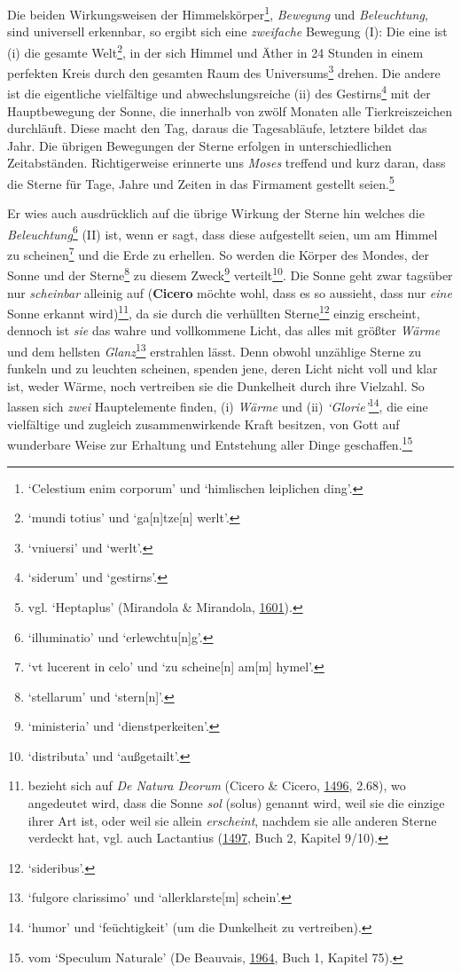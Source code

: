 \documentclass[
]{article}
\begin{document}
Die beiden Wirkungsweisen der Himmelskörper\footnote{`Celestium enim
  corporum' und `himlischen leiplichen ding'.}, \emph{Bewegung} und
\emph{Beleuchtung}, sind universell erkennbar, so ergibt sich eine
\emph{zweifache} Bewegung (I): Die eine ist (i) die gesamte
Welt\footnote{`mundi totius' und `ga{[}n{]}tze{[}n{]} werlt'.}, in der
sich Himmel und Äther in 24 Stunden in einem perfekten Kreis durch den
gesamten Raum des Universums\footnote{`vniuersi' und `werlt'.} drehen.
Die andere ist die eigentliche vielfältige und abwechslungsreiche (ii)
des Gestirns\footnote{`siderum' und `gestirns'.} mit der Hauptbewegung
der Sonne, die innerhalb von zwölf Monaten alle Tierkreiszeichen
durchläuft. Diese macht den Tag, daraus die Tagesabläufe, letztere
bildet das Jahr. Die übrigen Bewegungen der Sterne erfolgen in
unterschiedlichen Zeitabständen. Richtigerweise erinnerte uns
\emph{Moses} treffend und kurz daran, dass die Sterne für Tage, Jahre
und Zeiten in das Firmament gestellt seien.\footnote{vgl. `Heptaplus'
  (Mirandola \& Mirandola,
  \href{https://doi.org/10.3931/e-rara-61217}{1601}).}

Er wies auch ausdrücklich auf die übrige Wirkung der Sterne hin welches
die \emph{Beleuchtung}\footnote{`illuminatio' und `erlewchtu{[}n{]}g'.}
(II) ist, wenn er sagt, dass diese aufgestellt seien, um am Himmel zu
scheinen\footnote{`vt lucerent in celo' und `zu scheine{[}n{]} am{[}m{]}
  hymel'.} und die Erde zu erhellen. So werden die Körper des Mondes,
der Sonne und der Sterne\footnote{`stellarum' und `stern{[}n{]}'.} zu
diesem Zweck\footnote{`ministeria' und `dienstperkeiten'.}
verteilt\footnote{`distributa' und `außgetailt'.}. Die Sonne geht zwar
tagsüber nur \emph{scheinbar} alleinig auf (\textbf{Cicero} möchte wohl,
dass es so aussieht, dass nur \emph{eine} Sonne erkannt
wird)\footnote{bezieht sich auf \emph{De Natura Deorum} (Cicero \&
  Cicero, \href{https://doi.org/10.3931/e-rara-89116}{1496}, 2.68), wo
  angedeutet wird, dass die Sonne \emph{sol} (solus) genannt wird, weil
  sie die einzige ihrer Art ist, oder weil sie allein \emph{erscheint},
  nachdem sie alle anderen Sterne verdeckt hat, vgl. auch Lactantius
  (\href{https://books.google.com/books?id=qGsnghsi3uUC}{1497}, Buch 2,
  Kapitel 9/10).}, da sie durch die verhüllten Sterne\footnote{`sideribus'.}
einzig erscheint, dennoch ist \emph{sie} das wahre und vollkommene
Licht, das alles mit größter \emph{Wärme} und dem hellsten
\emph{Glanz}\footnote{`fulgore clarissimo' und `allerklarste{[}m{]}
  schein'.} erstrahlen lässt. Denn obwohl unzählige Sterne zu funkeln
und zu leuchten scheinen, spenden jene, deren Licht nicht voll und klar
ist, weder Wärme, noch vertreiben sie die Dunkelheit durch ihre
Vielzahl. So lassen sich \emph{zwei} Hauptelemente finden, (i)
\emph{Wärme} und (ii) \emph{`Glorie'}\footnote{`humor' und
  `feüchtigkeit' (um die Dunkelheit zu vertreiben).}, die eine
vielfältige und zugleich zusammenwirkende Kraft besitzen, von Gott auf
wunderbare Weise zur Erhaltung und Entstehung aller Dinge
geschaffen.\footnote{vom `Speculum Naturale' (De Beauvais,
  \href{https://nbn-resolving.org/urn:nbn:de:hbz:061:1-20612}{1964},
  Buch 1, Kapitel 75).}
\end{document}
